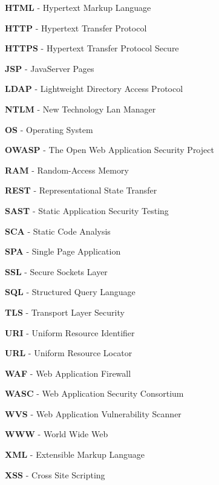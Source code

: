 \documentclass[12pt,oneside,a4paper,parskip,pointlessnumbers]{scrbook}
\begin{document}
  \textbf{HTML} - Hypertext Markup Language

  \textbf{HTTP} - Hypertext Transfer Protocol

  \textbf{HTTPS} - Hypertext Transfer Protocol Secure

  \textbf{JSP} - JavaServer Pages

  \textbf{LDAP} - Lightweight Directory Access Protocol

  \textbf{NTLM} - New Technology Lan Manager

  \textbf{OS} - Operating System

  \textbf{OWASP} - The Open Web Application Security Project

  \textbf{RAM} - Random-Access Memory

  \textbf{REST} - Representational State Transfer

  \textbf{SAST} - Static Application Security Testing

  \textbf{SCA} - Static Code Analysis

  \textbf{SPA} - Single Page Application

  \textbf{SSL} - Secure Sockets Layer

  \textbf{SQL} - Structured Query Language

  \textbf{TLS} - Transport Layer Security

  \textbf{URI} - Uniform Resource Identifier

  \textbf{URL} - Uniform Resource Locator

  \textbf{WAF} - Web Application Firewall

  \textbf{WASC} - Web Application Security Consortium

  \textbf{WVS} - Web Application Vulnerability Scanner

  \textbf{WWW} - World Wide Web

  \textbf{XML} - Extensible Markup Language

  \textbf{XSS} - Cross Site Scripting
  \newpage
\end{document}
